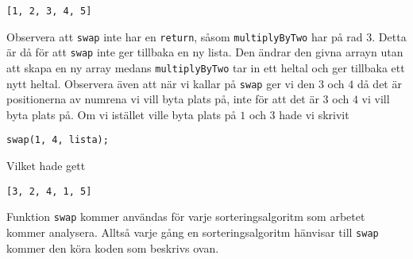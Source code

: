 \documentclass[a4]{article}
\begin{document}
\begin{lstlisting}[style=mystyle, numbers=none]
 [1, 2, 3, 4, 5]
\end{lstlisting}
Observera att \lstinline{swap} inte har en \lstinline{return}, såsom \lstinline{multiplyByTwo} har på rad $3$. Detta är då för att \lstinline{swap} inte ger tillbaka en ny lista. Den ändrar den givna arrayn utan att skapa en ny array medans \lstinline{multiplyByTwo} tar in ett heltal och ger tillbaka ett nytt heltal. Observera även att när vi kallar på \lstinline{swap} ger vi den $3$ och $4$ då det är positionerna av numrena vi vill byta plats på, inte för att det är $3$ och $4$ vi vill byta plats på. Om vi istället ville byta plats på $1$ och $3$ hade vi skrivit
\begin{lstlisting}[style=mystyle, numbers=none]
 swap(1, 4, lista);
\end{lstlisting}
Vilket hade gett
\begin{lstlisting}[style=mystyle, numbers=none]
 [3, 2, 4, 1, 5]
\end{lstlisting}
Funktion \lstinline{swap} kommer användas för varje sorteringsalgoritm som arbetet kommer analysera. Alltså varje gång en sorteringsalgoritm hänvisar till \lstinline{swap} kommer den köra koden som beskrivs ovan.
\end{document}
